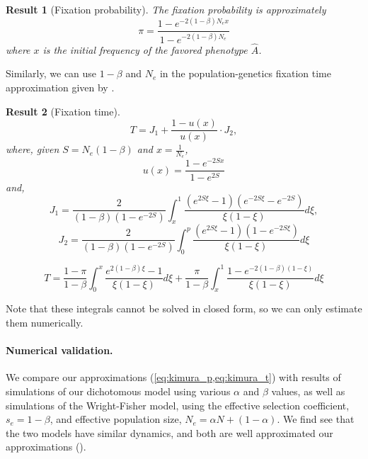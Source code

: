 \documentclass[12pt]{extarticle}
\newtheorem{result}{Result}
\begin{document}
\begin{result}[Fixation probability]
The fixation probability is approximately
\begin{equation}\label{eq:kimura_p}
\pi = \frac{1-e^{-2(1-\beta)N_e x}}{1-e^{-2(1-\beta)N_e}}
\end{equation}
where $x$ is the initial frequency of the favored phenotype $\hat{A}$.
\end{result}

Similarly, we can use $1-\beta$ and $N_e$ in the population-genetics fixation time approximation given by \citet[eq.~17]{kimura_average}.\\


\begin{result}[Fixation time]
\begin{equation}
T = J_1 + \frac{1-u(x)}{u(x)}\cdot J_2,
\end{equation}
where, given $S=N_e(1-\beta)$ and $x=\frac{1}{N_e}$,
\begin{equation}
u(x)=\frac{1-e^{-2Sx}}{1-e^{2S}}
\end{equation}
and,
\begin{equation}
J_1 = \frac{2}{(1-\beta)(1-e^{-2S})}\int_x^1 \frac{(e^{2S\xi}-1)(e^{-2S\xi}-e^{-2S})}{\xi(1-\xi)}d\xi,
\end{equation}
\begin{equation}
J_2= \frac{2}{(1-\beta)(1-e^{-2S})}\int_0^p \frac{(e^{2S\xi}-1)(1-e^{-2S\xi})}{\xi(1-\xi)}d\xi
\end{equation}

\begin{equation}\label{eq:kimura_t}
T = \frac{1-\pi}{1-\beta}\int_0^x\frac{e^{2(1-\beta) \xi}-1}{\xi(1-\xi)}d\xi+ \frac{\pi}{1-\beta}\int_x^1\frac{1-e^{-2(1-\beta)(1-\xi)}}{\xi(1-\xi)}d\xi
\end{equation}
\end{result}
Note that these integrals cannot be solved in closed form, so we can only estimate them numerically.

\paragraph{Numerical validation.}
We compare our approximations (\cref{eq:kimura_p,eq:kimura_t}) with results of simulations of our dichotomous model using various $\alpha$ and $\beta$ values, as well as simulations of the Wright-Fisher model, using the effective selection coefficient, $s_e=1-\beta$, and effective population size, $N_e=\alpha N + (1-\alpha)$. 
We find see that the two models have similar dynamics, and both are well approximated our approximations ().
\end{document}
